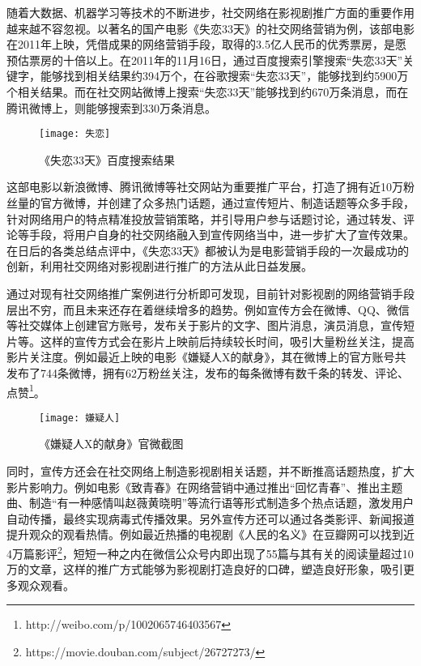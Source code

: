随着大数据、机器学习等技术的不断进步，社交网络在影视剧推广方面的重要作用越来越不容忽视。以著名的国产电影《失恋33天》的社交网络营销为例，该部电影在2011年上映，凭借成果的网络营销手段，取得的3.5亿人民币的优秀票房，是愿预估票房的十倍以上\cite{熊莉2012失恋}。在2011年的11月16日，通过百度搜索引擎搜索“失恋33天”关键字，能够找到相关结果约394万个，在谷歌搜索“失恋33天”，能够找到约5900万个相关结果。而在社交网站微博上搜索“失恋33天”能够找到约670万条消息，而在腾讯微博上，则能够搜索到330万条消息\cite{熊莉2012失恋}。

\begin{figure}[h] 
  \centering
  \texttt{[image: 失恋]}
  \caption{《失恋33天》百度搜索结果}
  \label{失恋}
\end{figure}

这部电影以新浪微博、腾讯微博等社交网站为重要推广平台，打造了拥有近10万粉丝量的官方微博，并创建了众多热门话题，通过宣传短片、制造话题等众多手段，针对网络用户的特点精准投放营销策略，并引导用户参与话题讨论，通过转发、评论等手段，将用户自身的社交网络融入到宣传网络当中，进一步扩大了宣传效果。在日后的各类总结点评中，《失恋33天》都被认为是电影营销手段的一次最成功的创新，利用社交网络对影视剧进行推广的方法从此日益发展。

通过对现有社交网络推广案例进行分析即可发现，目前针对影视剧的网络营销手段层出不穷，而且未来还存在着继续增多的趋势。例如宣传方会在微博、QQ、微信等社交媒体上创建官方账号，发布关于影片的文字、图片消息，演员消息，宣传短片等。这样的宣传方式会在影片上映前后持续较长时间，吸引大量粉丝关注，提高影片关注度。例如最近上映的电影《嫌疑人X的献身》，其在微博上的官方账号共发布了744条微博，拥有62万粉丝关注，发布的每条微博有数千条的转发、评论、点赞\footnote{http://weibo.com/p/1002065746403567}。

\begin{figure}[h] 
  \centering
  \texttt{[image: 嫌疑人]}
  \caption{《嫌疑人X的献身》官微截图}
\end{figure}

同时，宣传方还会在社交网络上制造影视剧相关话题，并不断推高话题热度，扩大影片影响力。例如电影《致青春》在网络营销中通过推出“回忆青春”、推出主题曲、制造“有一种感情叫赵薇黄晓明”等流行语等形式制造多个热点话题，激发用户自动传播，最终实现病毒式传播效果。另外宣传方还可以通过各类影评、新闻报道提升观众的观看热情。例如最近热播的电视剧《人民的名义》在豆瓣网可以找到近4万篇影评\footnote{https://movie.douban.com/subject/26727273/}，短短一种之内在微信公众号内即出现了55篇与其有关的阅读量超过10万的文章，这样的推广方式能够为影视剧打造良好的口碑，塑造良好形象，吸引更多观众观看。

